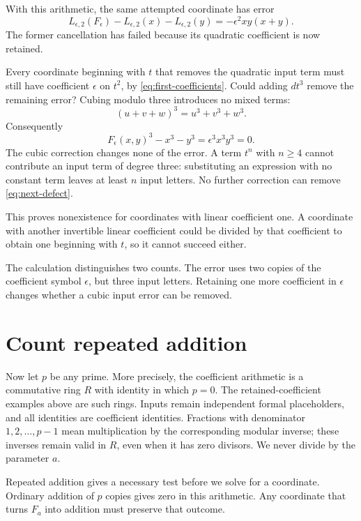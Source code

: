 With this arithmetic, the same attempted coordinate has error
\begin{equation}\label{eq:next-defect}
 L_{\epsilon,2}(F_\epsilon)-L_{\epsilon,2}(x)-L_{\epsilon,2}(y)
 =-\epsilon^2xy(x+y).
\end{equation}
The former cancellation has failed because its quadratic coefficient is now retained.

Every coordinate beginning with \(t\) that removes the quadratic input term must still have coefficient \(\epsilon\) on \(t^2\), by \eqref{eq:first-coefficients}. Could adding \(d t^3\) remove the remaining error? Cubing modulo three introduces no mixed terms:
\[
 (u+v+w)^3=u^3+v^3+w^3.
\]
Consequently
\[
 F_\epsilon(x,y)^3-x^3-y^3=\epsilon^3x^3y^3=0.
\]
The cubic correction changes none of the error. A term \(t^n\) with \(n\ge4\) cannot contribute an input term of degree three: substituting an expression with no constant term leaves at least \(n\) input letters. No further correction can remove \eqref{eq:next-defect}.

This proves nonexistence for coordinates with linear coefficient one. A coordinate with another invertible linear coefficient could be divided by that coefficient to obtain one beginning with \(t\), so it cannot succeed either.

The calculation distinguishes two counts. The error uses two copies of the coefficient symbol \(\epsilon\), but three input letters. Retaining one more coefficient in \(\epsilon\) changes whether a cubic input error can be removed.

\section{Count repeated addition}\label{sec:repeated}

Now let \(p\) be any prime. More precisely, the coefficient arithmetic is a commutative ring \(R\) with identity in which \(p=0\). The retained-coefficient examples above are such rings. Inputs remain independent formal placeholders, and all identities are coefficient identities. Fractions with denominator \(1,2,\ldots,p-1\) mean multiplication by the corresponding modular inverse; these inverses remain valid in \(R\), even when it has zero divisors. We never divide by the parameter \(a\).

Repeated addition gives a necessary test before we solve for a coordinate. Ordinary addition of \(p\) copies gives zero in this arithmetic. Any coordinate that turns \(F_a\) into addition must preserve that outcome.


